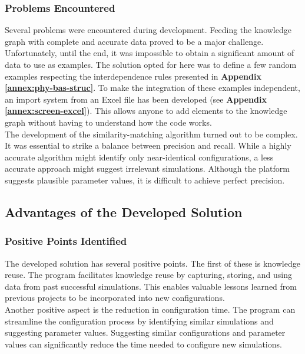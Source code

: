     
    \subsubsection*{Problems Encountered}
    Several problems were encountered during development. Feeding the knowledge graph with complete and accurate data proved to be a major challenge. Unfortunately, until the end, it was impossible to obtain a significant amount of data to use as examples. The solution opted for here was to define a few random examples respecting the interdependence rules presented in \textbf{Appendix \ref{annex:phy-bas-struc}}. To make the integration of these examples independent, an import system from an Excel file has been developed (see \textbf{Appendix \ref{annex:screen-excel}}). This allows anyone to add elements to the knowledge graph without having to understand how the code works.\\

    The development of the similarity-matching algorithm turned out to be complex. It was essential to strike a balance between precision and recall. While a highly accurate algorithm might identify only near-identical configurations, a less accurate approach might suggest irrelevant simulations. Although the platform suggests plausible parameter values, it is difficult to achieve perfect precision.\\


\subsection{Advantages of the Developed Solution}
    \subsubsection*{Positive Points Identified}
    The developed solution has several positive points. The first of these is knowledge reuse. The program facilitates knowledge reuse by capturing, storing, and using data from past successful simulations. This enables valuable lessons learned from previous projects to be incorporated into new configurations.\\

    Another positive aspect is the reduction in configuration time. The program can streamline the configuration process by identifying similar simulations and suggesting parameter values. Suggesting similar configurations and parameter values can significantly reduce the time needed to configure new simulations.\\
    
